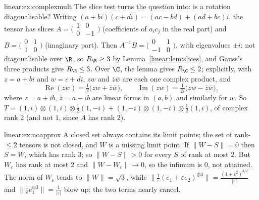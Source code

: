 \begin{solution}{linear:ex:complexmult}
\idea The slice test turns the question into: is a rotation diagonalisable?
\writeup Writing $(a+bi)(c+di)=(ac-bd)+(ad+bc)i$, the tensor has slices $A=\bigl(\begin{smallmatrix}1&0\\0&-1\end{smallmatrix}\bigr)$
(coefficients of $a_ic_j$ in the real part) and $B=\bigl(\begin{smallmatrix}0&1\\1&0\end{smallmatrix}\bigr)$ (imaginary part). Then
$A^{-1}B=\bigl(\begin{smallmatrix}0&1\\-1&0\end{smallmatrix}\bigr)$, with eigenvalues $\pm i$: not diagonalisable over $\R$, so $R_\R\ge3$
by Lemma~\ref{linear:lem:slices}, and Gauss's three products give $R_\R\le3$. Over $\C$, the lemma gives $R_\C\le2$; explicitly, with $z=a+bi$
and $w=c+di$, $zw$ and $\bar z\bar w$ are each one complex product, and
\[
\operatorname{Re}(zw)=\tfrac12\bigl(zw+\bar z\bar w\bigr),\qquad\operatorname{Im}(zw)=\tfrac1{2i}\bigl(zw-\bar z\bar w\bigr),
\]
where $z=a+ib$, $\bar z=a-ib$ are linear forms in $(a,b)$ and similarly for $w$. So $T=(1,i)\otimes(1,i)\otimes\frac12(1,-i)+(1,-i)\otimes
(1,-i)\otimes\frac12(1,i)$, of complex rank $2$ (and not $1$, since $A$ has rank $2$).
\end{solution}

\begin{solution}{linear:ex:noapprox}
\idea A closed set always contains its limit points; the set of rank-$\le2$ tensors is not closed, and $W$ is a missing limit point.
\writeup If $\|W-S\|=0$ then $S=W$, which has rank $3$; so $\|W-S\|>0$ for every $S$ of rank at most $2$. But $W_\varepsilon$ has rank at
most $2$ and $\|W-W_\varepsilon\|\to0$, so the infimum is $0$, not attained. The norm of $W_\varepsilon$ tends to $\|W\|=\sqrt3$, while
$\|\frac1\varepsilon(e_1+\varepsilon e_2)^{\otimes3}\|=\frac{(1+\varepsilon^2)^{3/2}}{|\varepsilon|}$ and $\|\frac1\varepsilon e_1^{\otimes3}\|=\frac1
{|\varepsilon|}$ blow up: the two terms nearly cancel.
\end{solution}

